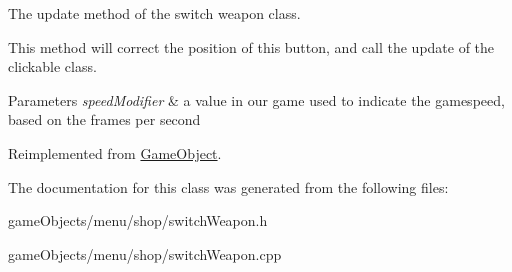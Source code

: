 The update method of the switch weapon class. 

This method will correct the position of this button, and call the update of the clickable class. 
\begin{DoxyParams}{Parameters}
{\em speed\+Modifier} & a value in our game used to indicate the gamespeed, based on the frames per second \\
\hline
\end{DoxyParams}


Reimplemented from \hyperlink{class_game_object_acf6423054877d1344b6e0b1f4e740df5}{Game\+Object}.



The documentation for this class was generated from the following files\+:\begin{DoxyCompactItemize}
\item 
game\+Objects/menu/shop/switch\+Weapon.\+h\item 
game\+Objects/menu/shop/switch\+Weapon.\+cpp\end{DoxyCompactItemize}
